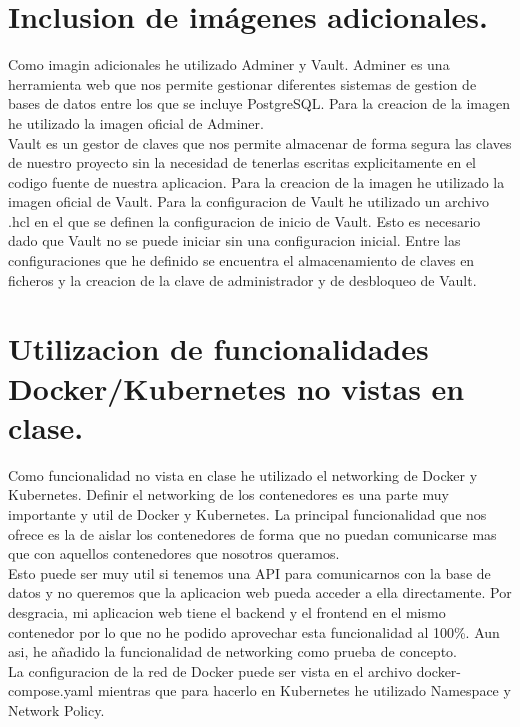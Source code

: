 \documentclass{report}
\begin{document}
        \section{Inclusion de imágenes adicionales.}
            Como imagin adicionales he utilizado Adminer y Vault.
            Adminer es una herramienta web que nos permite gestionar diferentes sistemas de gestion de bases de datos entre los que se incluye PostgreSQL.
            Para la creacion de la imagen he utilizado la imagen oficial de Adminer.\\

            Vault es un gestor de claves que nos permite almacenar de forma segura las claves de nuestro proyecto sin la necesidad de tenerlas escritas explicitamente en el codigo fuente de nuestra aplicacion.
            Para la creacion de la imagen he utilizado la imagen oficial de Vault.
            Para la configuracion de Vault he utilizado un archivo .hcl en el que se definen la configuracion de inicio de Vault. Esto es necesario dado que Vault no se puede iniciar sin una configuracion inicial.
            Entre las configuraciones que he definido se encuentra el almacenamiento de claves en ficheros y la creacion de la clave de administrador y de desbloqueo de Vault.
        \clearpage
        \section{Utilizacion de funcionalidades Docker/Kubernetes no vistas en clase.}
            Como funcionalidad no vista en clase he utilizado el networking de Docker y Kubernetes.
            Definir el networking de los contenedores es una parte muy importante y util de Docker y Kubernetes.
            La principal funcionalidad que nos ofrece es la de aislar los contenedores de forma que no puedan comunicarse mas que con aquellos contenedores que nosotros queramos.\\

            Esto puede ser muy util si tenemos una API para comunicarnos con la base de datos y no queremos que la aplicacion web pueda acceder a ella directamente.
            Por desgracia, mi aplicacion web tiene el backend y el frontend en el mismo contenedor por lo que no he podido aprovechar esta funcionalidad al 100\%.
            Aun asi, he añadido la funcionalidad de networking como prueba de concepto.\\

            La configuracion de la red de Docker puede ser vista en el archivo docker-compose.yaml mientras que para hacerlo en Kubernetes he utilizado Namespace y Network Policy.
        \clearpage
\end{document}
